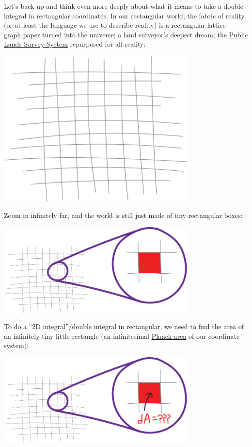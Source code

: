 \documentclass[
]{article}
\begin{document}
Let's back up and think even more deeply about what it means to take a double integral in rectangular coordinates. In our rectangular world, the fabric of reality (or at least the language we use to describe reality) is a rectangular lattice---graph paper turned into the universe; a land surveyor's deepest dream; the \href{https://en.wikipedia.org/wiki/Public_Land_Survey_System}{Public Lands Survey System} repurposed for all reality:

\includegraphics[width=0.75\textwidth,height=\textheight]{rectangular-world-1.svg}

Zoom in infinitely far, and the world is still just made of tiny rectangular boxes:

\includegraphics[width=0.75\textwidth,height=\textheight]{rectangular-world-2.svg}

To do a ``2D integral''/double integral in rectangular, we need to find the area of an infinitely-tiny little rectangle (an infinitesimal \href{https://en.wikipedia.org/wiki/Planck_units}{Planck area} of our coordinate system):

\includegraphics[width=0.75\textwidth,height=\textheight]{rectangular-world-3.svg}
\end{document}
